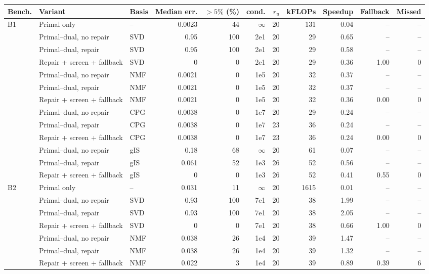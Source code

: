 \begin{tabular}{@{}lllrrrrrrrr@{}}
\toprule
Bench. & Variant & Basis & Median err. & $>5\%$ (\%) & cond. & $r_u$ & kFLOPs & Speedup & Fallback & Missed \\
\midrule
B1 & Primal only & -- & 0.0023 & 44 & $\infty$ & 20 & 131 & 0.04 & -- & -- \\
 & Primal--dual, no repair & SVD & 0.95 & 100 & 2e1 & 20 & 29 & 0.65 & -- & -- \\
 & Primal--dual, repair & SVD & 0.95 & 100 & 2e1 & 20 & 29 & 0.58 & -- & -- \\
 & Repair + screen + fallback & SVD & 0 & 0 & 2e1 & 20 & 29 & 0.36 & 1.00 & 0 \\
 & Primal--dual, no repair & NMF & 0.0021 & 0 & 1e5 & 20 & 32 & 0.37 & -- & -- \\
 & Primal--dual, repair & NMF & 0.0021 & 0 & 1e5 & 20 & 32 & 0.37 & -- & -- \\
 & Repair + screen + fallback & NMF & 0.0021 & 0 & 1e5 & 20 & 32 & 0.36 & 0.00 & 0 \\
 & Primal--dual, no repair & CPG & 0.0038 & 0 & 1e7 & 20 & 29 & 0.24 & -- & -- \\
 & Primal--dual, repair & CPG & 0.0038 & 0 & 1e7 & 23 & 36 & 0.24 & -- & -- \\
 & Repair + screen + fallback & CPG & 0.0038 & 0 & 1e7 & 23 & 36 & 0.24 & 0.00 & 0 \\
 & Primal--dual, no repair & gIS & 0.18 & 68 & $\infty$ & 20 & 61 & 0.07 & -- & -- \\
 & Primal--dual, repair & gIS & 0.061 & 52 & 1e3 & 26 & 52 & 0.56 & -- & -- \\
 & Repair + screen + fallback & gIS & 0 & 0 & 1e3 & 26 & 52 & 0.41 & 0.55 & 0 \\
\midrule
B2 & Primal only & -- & 0.031 & 11 & $\infty$ & 20 & 1615 & 0.01 & -- & -- \\
 & Primal--dual, no repair & SVD & 0.93 & 100 & 7e1 & 20 & 38 & 1.99 & -- & -- \\
 & Primal--dual, repair & SVD & 0.93 & 100 & 7e1 & 20 & 38 & 2.05 & -- & -- \\
 & Repair + screen + fallback & SVD & 0 & 0 & 7e1 & 20 & 38 & 0.66 & 1.00 & 0 \\
 & Primal--dual, no repair & NMF & 0.038 & 26 & 1e4 & 20 & 39 & 1.47 & -- & -- \\
 & Primal--dual, repair & NMF & 0.038 & 26 & 1e4 & 20 & 39 & 1.32 & -- & -- \\
 & Repair + screen + fallback & NMF & 0.022 & 3 & 1e4 & 20 & 39 & 0.89 & 0.39 & 6 \\

\end{tabular}
